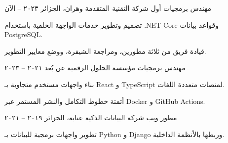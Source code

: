 
\begin{cventries}

\cventry
  {مهندس برمجيات أول}
  {شركة التقنية المتقدمة}
  {وهران، الجزائر}
  {٢٠٢٣ – الآن}
  {
    \begin{cvitems}
      \item تصميم وتطوير خدمات الواجهة الخلفية باستخدام \textenglish{.NET Core} وقواعد بيانات \textenglish{PostgreSQL}.
      \item قيادة فريق من ثلاثة مطورين، ومراجعة الشيفرة، ووضع معايير التطوير.
    \end{cvitems}
  }

\cventry
  {مهندس برمجيات}
  {مؤسسة الحلول الرقمية}
  {عن بُعد}
  {٢٠٢١ – ٢٠٢٣}
  {
    \begin{cvitems}
      \item بناء واجهات مستخدم متجاوبة بـ \textenglish{React} و \textenglish{TypeScript} لمنصات متعددة اللغات.
      \item أتمتة خطوط التكامل والنشر المستمر عبر \textenglish{Docker} و \textenglish{GitHub Actions}.
    \end{cvitems}
  }

\cventry
  {مطور ويب}
  {شركة البيانات الذكية}
  {عنابة، الجزائر}
  {٢٠١٩ – ٢٠٢١}
  {
    \begin{cvitems}
      \item تطوير واجهات برمجية للبيانات بـ \textenglish{Python} و \textenglish{Django} وربطها بالأنظمة الداخلية.
    \end{cvitems}
  }

\end{cventries}
